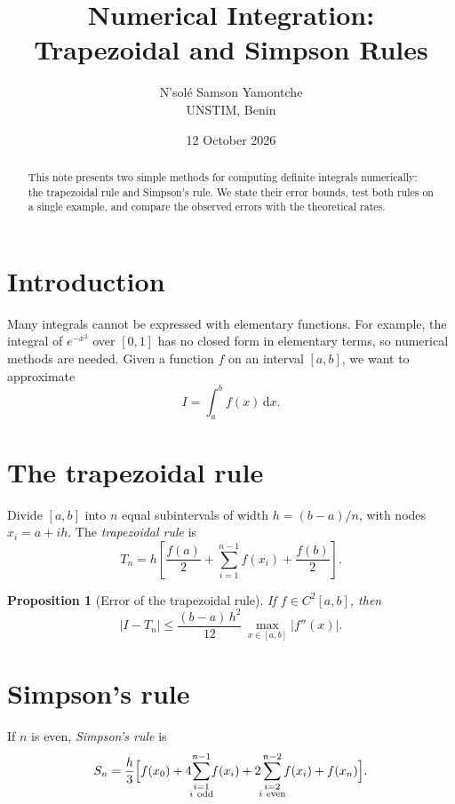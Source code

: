 \documentclass[11pt,a4paper]{article}
\title{\bfseries Numerical Integration:\\ Trapezoidal and Simpson Rules}
\author{N'sol\'e Samson Yamontche\\[2pt]\small UNSTIM, Benin}
\date{12 October 2026}
\newtheorem{proposition}{Proposition}
\begin{document}
\maketitle

\begin{abstract}
\noindent
This note presents two simple methods for computing definite integrals numerically: the trapezoidal rule and Simpson's rule.
We state their error bounds, test both rules on a single example, and compare the observed errors with the theoretical rates.
\end{abstract}

\section{Introduction}
Many integrals cannot be expressed with elementary functions. For example, the integral of $e^{-x^{2}}$ over $[0,1]$ has no closed form in elementary terms, so numerical methods are needed.
Given a function $f$ on an interval $[a,b]$, we want to approximate
\begin{equation}
  I = \int_a^b f(x)\,\mathrm{d}x.
  \label{eq:integral}
\end{equation}

\section{The trapezoidal rule}
Divide $[a,b]$ into $n$ equal subintervals of width $h=(b-a)/n$, with nodes $x_i=a+ih$. The \emph{trapezoidal rule} is
\begin{equation}
  T_n = h\left[\frac{f(a)}{2} + \sum_{i=1}^{n-1} f(x_i) + \frac{f(b)}{2}\right].
  \label{eq:trap}
\end{equation}

\begin{proposition}[Error of the trapezoidal rule]\label{prop:trap}
If $f\in C^{2}[a,b]$, then
\begin{equation}
  \lvert I - T_n\rvert \le \frac{(b-a)\,h^{2}}{12}\,\max_{x\in[a,b]}\lvert f''(x)\rvert .
  \label{eq:trap-err}
\end{equation}
\end{proposition}

\section{Simpson's rule}
If $n$ is even, \emph{Simpson's rule} is
\begin{equation}
  S_n = \frac{h}{3}\Bigl[f(x_0) + 4\!\!\sum_{\substack{i=1\\ i\ \text{odd}}}^{n-1}\!\! f(x_i)
        + 2\!\!\sum_{\substack{i=2\\ i\ \text{even}}}^{n-2}\!\! f(x_i) + f(x_n)\Bigr].
  \label{eq:simpson}
\end{equation}
\end{document}
